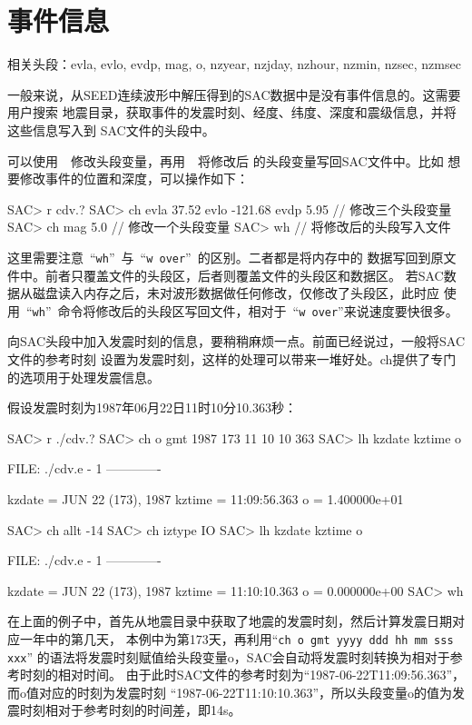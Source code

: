 \section{事件信息}
\label{sec:event-info}
相关头段：evla, evlo, evdp, mag, o, nzyear, nzjday, nzhour, nzmin, nzsec, nzmsec

一般来说，从SEED连续波形中解压得到的SAC数据中是没有事件信息的。这需要用户搜索
地震目录，获取事件的发震时刻、经度、纬度、深度和震级信息，并将这些信息写入到
SAC文件的头段中。

可以使用~~修改头段变量，再用~~将修改后
的头段变量写回SAC文件中。比如
想要修改事件的位置和深度，可以操作如下：
\begin{SACCode}
SAC> r cdv.?
SAC> ch evla 37.52 evlo -121.68 evdp 5.95   // 修改三个头段变量
SAC> ch mag 5.0                             // 修改一个头段变量
SAC> wh                                     // 将修改后的头段写入文件
\end{SACCode}

这里需要注意~``\lstinline{wh}''~与~``\lstinline{w over}''~的区别。二者都是将内存中的
数据写回到原文件中。前者只覆盖文件的头段区，后者则覆盖文件的头段区和数据区。
若SAC数据从磁盘读入内存之后，未对波形数据做任何修改，仅修改了头段区，此时应
使用~``\lstinline{wh}''~命令将修改后的头段区写回文件，相对于~``\lstinline{w over}''来说速度要快很多。

向SAC头段中加入发震时刻的信息，要稍稍麻烦一点。前面已经说过，一般将SAC文件的参考时刻
设置为发震时刻，这样的处理可以带来一堆好处。ch提供了专门的选项用于处理发震信息。

假设发震时刻为1987年06月22日11时10分10.363秒：
\label{code:origin-time}
\begin{SACCode}
SAC> r ./cdv.?
SAC> ch o gmt 1987 173 11 10 10 363
SAC> lh kzdate kztime o
  
  FILE: ./cdv.e - 1
 -------------

     kzdate = JUN 22 (173), 1987
     kztime = 11:09:56.363
          o = 1.400000e+01
  
SAC> ch allt -14
SAC> ch iztype IO
SAC> lh kzdate kztime o
  
  FILE: ./cdv.e - 1
 -------------

     kzdate = JUN 22 (173), 1987
     kztime = 11:10:10.363
          o = 0.000000e+00
SAC> wh
\end{SACCode}

在上面的例子中，首先从地震目录中获取了地震的发震时刻，然后计算发震日期对应一年中的第几天，
本例中为第173天，再利用``\lstinline{ch o gmt yyyy ddd hh mm sss xxx}''
的语法将发震时刻赋值给头段变量o，SAC会自动将发震时刻转换为相对于参考时刻的相对时间。
由于此时SAC文件的参考时刻为``1987-06-22T11:09:56.363''，而o值对应的时刻为发震时刻
``1987-06-22T11:10:10.363''，所以头段变量o的值为发震时刻相对于参考时刻的时间差，即14s。

